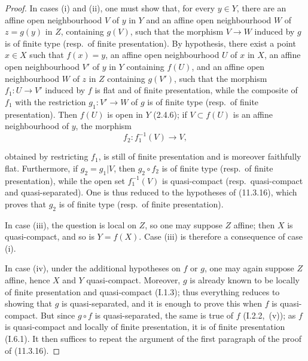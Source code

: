 \begin{proof}
In cases (i) and (ii), one must show that, for every $y\in Y$, there are an affine open neighbourhood $V$ of $y$ in $Y$ and an affine open neighbourhood $W$ of $z=g(y)$ in $Z$, containing $g(V)$, such that the morphism $V\to W$ induced by $g$ is of finite type (resp.\ of finite presentation).
By hypothesis, there exist a point $x\in X$ such that $f(x)=y$, an affine open neighbourhood $U$ of $x$ in $X$, an affine open neighbourhood $V'$ of $y$ in $Y$ containing $f(U)$, and an affine open neighbourhood $W$ of $z$ in $Z$ containing $g(V')$, such that the morphism $f_1:U\to V'$ induced by $f$ is flat and of finite presentation, while the composite of $f_1$ with the restriction $g_1:V'\to W$ of $g$ is of finite type (resp.\ of finite presentation).
Then $f(U)$ is open in $Y$ (2.4.6); if $V\subset f(U)$ is an affine neighbourhood of $y$, the morphism
\[
f_2:f_1^{-1}(V)\longrightarrow V,
\]


obtained by restricting $f_1$, is still of finite presentation and is moreover faithfully flat.
Furthermore, if $g_2=g_1|V$, then $g_2\circ f_2$ is of finite type (resp.\ of finite presentation), while the open set $f_1^{-1}(V)$ is quasi-compact (resp.\ quasi-compact and quasi-separated).
One is thus reduced to the hypotheses of (11.3.16), which proves that $g_2$ is of finite type (resp.\ of finite presentation).

In case (iii), the question is local on $Z$, so one may suppose $Z$ affine; then $X$ is quasi-compact, and so is $Y=f(X)$.
Case (iii) is therefore a consequence of case (i).

In case (iv), under the additional hypotheses on $f$ or $g$, one may again suppose $Z$ affine, hence $X$ and $Y$ quasi-compact.
Moreover, $g$ is already known to be locally of finite presentation and quasi-compact (I.1.3); thus everything reduces to showing that $g$ is quasi-separated, and it is enough to prove this when $f$ is quasi-compact.
But since $g\circ f$ is quasi-separated, the same is true of $f$ (I.2.2,~(v)); as $f$ is quasi-compact and locally of finite presentation, it is of finite presentation (I.6.1).
It then suffices to repeat the argument of the first paragraph of the proof of (11.3.16).
\end{proof}

